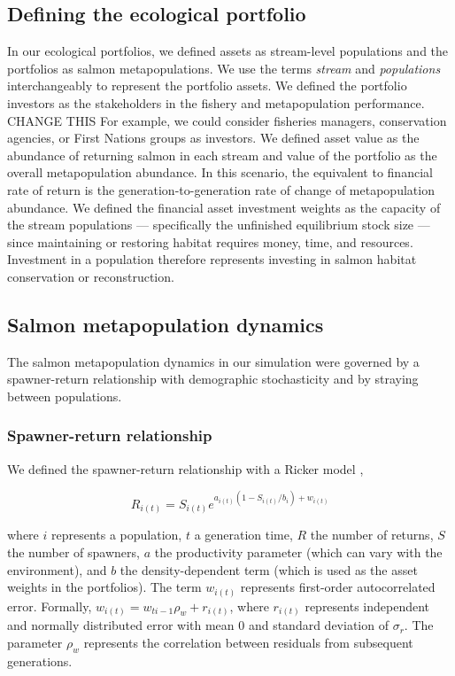 \subsection{Defining the ecological portfolio}

In our ecological portfolios, we defined assets as stream-level populations and the portfolios as salmon metapopulations. We use the terms \emph{stream} and \emph{populations} interchangeably to represent the portfolio assets. We defined the portfolio investors as the stakeholders in the fishery and metapopulation performance. CHANGE THIS For example, we could consider fisheries managers, conservation agencies, or First Nations groups as investors. We defined asset value as the abundance of returning salmon in each stream and value of the portfolio as the overall metapopulation abundance. In this scenario, the equivalent to financial rate of return is the generation-to-generation rate of change of metapopulation abundance. We defined the financial asset investment weights as the capacity of the stream populations --- specifically the unfinished equilibrium stock size --- since maintaining or restoring habitat requires money, time, and resources. Investment in a population therefore represents investing in salmon habitat conservation or reconstruction.

\subsection{Salmon metapopulation dynamics}

The salmon metapopulation dynamics in our simulation were governed by a spawner-return relationship with demographic stochasticity and by straying between populations.

\subsubsection{Spawner-return relationship}

We defined the spawner-return relationship with a Ricker model \citep{ricker1954},

\[R_{i(t)} = S_{i(t)}e^{a_{i(t)}(1-S_{i(t)}/b_i) + w_{i(t)}}\]

\noindent where $i$ represents a population, $t$ a generation time, $R$ the number of returns, $S$ the number of spawners, $a$ the productivity parameter (which can vary with the environment), and $b$ the density-dependent term (which is used as the asset weights in the portfolios). The term $w_{i(t)}$ represents first-order autocorrelated error. Formally, $w_{i(t)} = w_{ti-1} \rho_w + r_{i(t)}$, where $r_{i(t)}$ represents independent and normally distributed error with mean 0 and standard deviation of $\sigma_r$. The parameter $\rho_w$ represents the correlation between residuals from subsequent generations.

